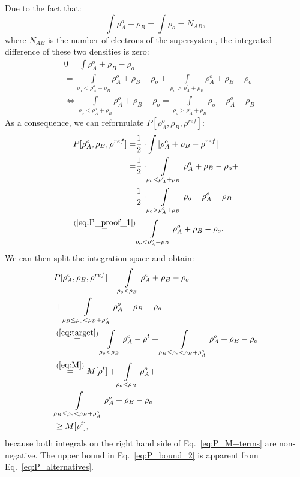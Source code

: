 \documentclass[journal=jctcce,manuscript=article, layout=twocolumn]{achemso}
\begin{document}
Due to the fact that:
\begin{equation}
 \int \rho^{o}_A + \rho_B = \int \rho_o = N_{AB},
\end{equation}
where $N_{AB}$ is the number of electrons of the supersystem, the integrated difference of these two densities is zero:
\begin{align}\label{eq:P_proof_1} \nonumber
 & 0 = \int \rho^{o}_A + \rho_B - \rho_o \\ \nonumber
 & = \int\limits_{\rho_o <\rho^{o}_A + \rho_B}\rho^{o}_A + \rho_B - \rho_o + \int\limits_{\rho_o > \rho^{o}_A + \rho_B}\rho^{o}_A + \rho_B - \rho_o \\ 
 & \Leftrightarrow \int\limits_{\rho_o < \rho^{o}_A + \rho_B}\rho^{o}_A + \rho_B - \rho_o = \int\limits_{\rho_o > \rho^{o}_A + \rho_B}\rho_o - \rho^{o}_A - \rho_B 
\end{align}
As a consequence, we can reformulate $P[\rho^{o}_A, \rho_B, \rho^{ref}]$:
\begin{align}\label{eq:P_alternatives} \nonumber
P[\rho^{o}_A, \rho_B, \rho^{ref}] = & \frac{1}{2} \cdot \int \vert \rho^{o}_A + \rho_B - \rho^{ref} \vert \\ \nonumber
= & \frac{1}{2} \cdot \int\limits_{\rho_o <\rho^{o}_A + \rho_B}\rho^{o}_A + \rho_B - \rho_o + \\ \nonumber
 & \frac{1}{2} \cdot \int\limits_{\rho_o > \rho^{o}_A + \rho_B} \rho_o - \rho^{o}_A - \rho_B  \\ 
 \overset{(\ref{eq:P_proof_1})}{=} & \int\limits_{\rho_o <\rho^{o}_A + \rho_B}\rho^{o}_A + \rho_B - \rho_o.
\end{align}
We can then split the integration space and obtain:
\begin{align}\label{eq:P_M+terms} \nonumber
& P[\rho^{o}_A, \rho_B, \rho^{ref}] = \int\limits_{\rho_o < \rho_B}\rho^{o}_A + \rho_B - \rho_o \\ \nonumber
 & + \int\limits_{\rho_B \leq \rho_o < \rho_B + \rho^{o}_A}\rho^{o}_A + \rho_B - \rho_o \\ \nonumber
 & \overset{(\ref{eq:target})}{=} \int\limits_{\rho_o < \rho_B}\rho^{o}_A - \rho^t + \int\limits_{\rho_B \leq \rho_o < \rho_B + \rho^{o}_A}\rho^{o}_A + \rho_B - \rho_o \\ \nonumber
 & \overset{(\ref{eq:M})}{=}  M[\rho^t] + \int\limits_{\rho_o < \rho_B}\rho^{o}_A + \\
 & \int\limits_{\rho_B \leq \rho_o < \rho_B + \rho^{o}_A}\rho^{o}_A + \rho_B - \rho_o \\ \nonumber
 & \geq M[\rho^t], 
\end{align}
because both integrals on the right hand side of Eq.~\ref{eq:P_M+terms} are non-negative.
The upper bound in Eq.~\ref{eq:P_bound_2} is apparent from Eq.~\ref{eq:P_alternatives}.


\end{document}
